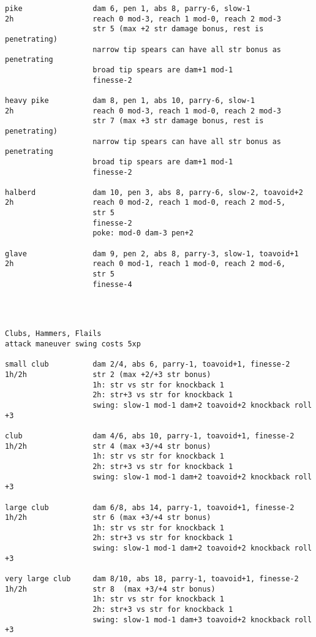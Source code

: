 \begin{verbatim}
pike                dam 6, pen 1, abs 8, parry-6, slow-1
2h                  reach 0 mod-3, reach 1 mod-0, reach 2 mod-3
                    str 5 (max +2 str damage bonus, rest is penetrating)
                    narrow tip spears can have all str bonus as penetrating
                    broad tip spears are dam+1 mod-1
                    finesse-2

heavy pike          dam 8, pen 1, abs 10, parry-6, slow-1
2h                  reach 0 mod-3, reach 1 mod-0, reach 2 mod-3
                    str 7 (max +3 str damage bonus, rest is penetrating)
                    narrow tip spears can have all str bonus as penetrating
                    broad tip spears are dam+1 mod-1
                    finesse-2

halberd             dam 10, pen 3, abs 8, parry-6, slow-2, toavoid+2
2h                  reach 0 mod-2, reach 1 mod-0, reach 2 mod-5,
                    str 5
                    finesse-2
                    poke: mod-0 dam-3 pen+2

glave               dam 9, pen 2, abs 8, parry-3, slow-1, toavoid+1
2h                  reach 0 mod-1, reach 1 mod-0, reach 2 mod-6,
                    str 5
                    finesse-4




\end{verbatim} \pagebreak[3] \begin{verbatim}
Clubs, Hammers, Flails
attack maneuver swing costs 5xp

small club          dam 2/4, abs 6, parry-1, toavoid+1, finesse-2
1h/2h               str 2 (max +2/+3 str bonus)
                    1h: str vs str for knockback 1
                    2h: str+3 vs str for knockback 1
                    swing: slow-1 mod-1 dam+2 toavoid+2 knockback roll +3

club                dam 4/6, abs 10, parry-1, toavoid+1, finesse-2
1h/2h               str 4 (max +3/+4 str bonus)
                    1h: str vs str for knockback 1
                    2h: str+3 vs str for knockback 1
                    swing: slow-1 mod-1 dam+2 toavoid+2 knockback roll +3

large club          dam 6/8, abs 14, parry-1, toavoid+1, finesse-2
1h/2h               str 6 (max +3/+4 str bonus)
                    1h: str vs str for knockback 1
                    2h: str+3 vs str for knockback 1
                    swing: slow-1 mod-1 dam+2 toavoid+2 knockback roll +3

very large club     dam 8/10, abs 18, parry-1, toavoid+1, finesse-2
1h/2h               str 8  (max +3/+4 str bonus)
                    1h: str vs str for knockback 1
                    2h: str+3 vs str for knockback 1
                    swing: slow-1 mod-1 dam+3 toavoid+2 knockback roll +3


\end{verbatim}
